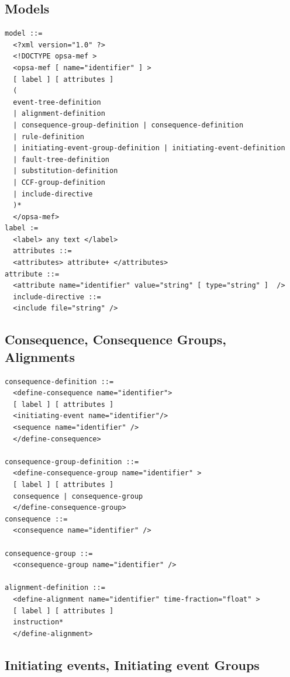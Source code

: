 \documentclass[11pt]{article}
\begin{document}
\subsection{Models}
\label{sec:orgb7f6d56}

\lstset{language=XML,label= ,caption= ,captionpos=b,numbers=none}
\begin{lstlisting}
model ::=
  <?xml version="1.0" ?>
  <!DOCTYPE opsa-mef >
  <opsa-mef [ name="identifier" ] >
  [ label ] [ attributes ]
  (
  event-tree-definition
  | alignment-definition
  | consequence-group-definition | consequence-definition
  | rule-definition
  | initiating-event-group-definition | initiating-event-definition
  | fault-tree-definition
  | substitution-definition
  | CCF-group-definition
  | include-directive
  )*
  </opsa-mef>
label :=
  <label> any text </label>
  attributes ::=
  <attributes> attribute+ </attributes>
attribute ::=
  <attribute name="identifier" value="string" [ type="string" ]  />
  include-directive ::=
  <include file="string" />
\end{lstlisting}


\subsection{Consequence, Consequence Groups, Alignments}
\label{sec:org2d1e0fb}


\lstset{language=[LaTeX]TeX,label= ,caption= ,captionpos=b,numbers=none}
\begin{lstlisting}
consequence-definition ::=
  <define-consequence name="identifier">
  [ label ] [ attributes ]
  <initiating-event name="identifier"/>
  <sequence name="identifier" />
  </define-consequence>

consequence-group-definition ::=
  <define-consequence-group name="identifier" >
  [ label ] [ attributes ]
  consequence | consequence-group
  </define-consequence-group>
consequence ::=
  <consequence name="identifier" />

consequence-group ::=
  <consequence-group name="identifier" />

alignment-definition ::=
  <define-alignment name="identifier" time-fraction="float" >
  [ label ] [ attributes ]
  instruction*
  </define-alignment>
\end{lstlisting}

\subsection{Initiating events, Initiating event Groups}
\label{sec:org198fe6d}
\end{document}
